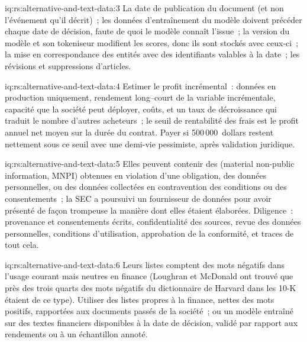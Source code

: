 \begin{solution}{iq:rs:alternative-and-text-data:3}
La date de publication du document (et non l'événement qu'il décrit)~; les données d'entraînement du modèle doivent précéder chaque date de décision, faute de quoi le modèle
connaît l'issue~; la version du modèle et son tokeniseur modifient les scores, donc ils sont stockés avec ceux-ci~; la mise en correspondance des entités avec des identifiants valables à la date~;
les révisions et suppressions d'articles.
\end{solution}

\begin{solution}{iq:rs:alternative-and-text-data:4}
Estimer le profit incrémental~: données en production uniquement, rendement long--court de la variable incrémentale, capacité que la société peut déployer, coûts, et un taux de décroissance
qui traduit le nombre d'autres acheteurs~; le seuil de rentabilité des frais est le profit annuel net moyen sur la durée du contrat. Payer si 500\,000~dollars
restent nettement sous ce seuil avec une demi-vie pessimiste, après validation juridique.
\end{solution}

\begin{solution}{iq:rs:alternative-and-text-data:5}
Elles peuvent contenir des  (material non-public information, MNPI) obtenues en violation d'une obligation, des données personnelles, ou des données collectées en contravention des conditions ou des consentements~; la SEC a
poursuivi un fournisseur de données pour avoir présenté de façon trompeuse la manière dont elles étaient élaborées. Diligence~: provenance et consentements écrits, confidentialité des sources,
revue des données personnelles, conditions d'utilisation, approbation de la conformité, et traces de tout cela.
\end{solution}

\begin{solution}{iq:rs:alternative-and-text-data:6}
Leurs listes comptent des mots négatifs dans l'usage courant mais neutres en finance (Loughran et McDonald ont trouvé que près des trois quarts des mots négatifs du dictionnaire de Harvard
dans les 10-K étaient de ce type). Utiliser des listes propres à la finance, nettes des mots positifs, rapportées aux documents passés de la société~;
ou un modèle entraîné sur des textes financiers disponibles à la date de décision, validé par rapport aux rendements ou à un échantillon annoté.
\end{solution}
